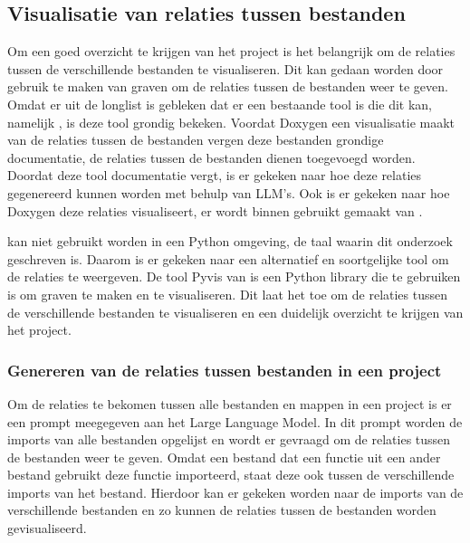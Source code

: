 \subsection{Visualisatie van relaties tussen bestanden}
\label{sec:project-documentatie-relaties}

Om een goed overzicht te krijgen van het project is het belangrijk om de relaties tussen de verschillende bestanden te visualiseren.
Dit kan gedaan worden door gebruik te maken van graven om de relaties tussen de bestanden weer te geven.
Omdat er uit de longlist is gebleken dat er een bestaande tool is die dit kan, namelijk \textcite{Doxygen2023}, is deze tool grondig bekeken.
Voordat Doxygen een visualisatie maakt van de relaties tussen de bestanden vergen deze bestanden grondige documentatie, de relaties tussen de bestanden dienen toegevoegd worden.
Doordat deze tool documentatie vergt, is er gekeken naar hoe deze relaties gegenereerd kunnen worden met behulp van LLM's.
Ook is er gekeken naar hoe Doxygen deze relaties visualiseert, er wordt binnen \textcite{Doxygen2023} gebruikt gemaakt van \textcite{GraphvizAuthors2024}.

\textcite{GraphvizAuthors2024} kan niet gebruikt worden in een Python omgeving, de taal waarin dit onderzoek geschreven is.
Daarom is er gekeken naar een alternatief en soortgelijke tool om de relaties te weergeven.
De tool Pyvis van \textcite{WHIR2018} is een Python library die te gebruiken is om graven te maken en te visualiseren.
Dit laat het toe om de relaties tussen de verschillende bestanden te visualiseren en een duidelijk overzicht te krijgen van het project.

\subsubsection{Genereren van de relaties tussen bestanden in een project}
\label{subsec:project-documentatie-relaties-genereren}

Om de relaties te bekomen tussen alle bestanden en mappen in een project is er een prompt meegegeven aan het Large Language Model.
In dit prompt worden de imports van alle bestanden opgelijst en wordt er gevraagd om de relaties tussen de bestanden weer te geven.
Omdat een bestand dat een functie uit een ander bestand gebruikt deze functie importeerd, staat deze ook tussen de verschillende imports van het bestand.
Hierdoor kan er gekeken worden naar de imports van de verschillende bestanden en zo kunnen de relaties tussen de bestanden worden gevisualiseerd.

